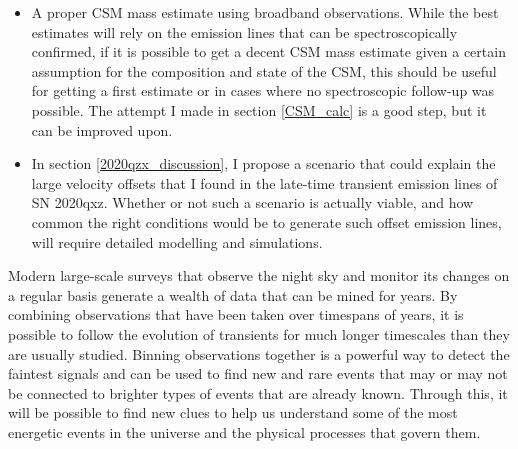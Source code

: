 \documentclass[a4paper,oneside,12pt, class=Latex/Classes/PhDthesisPSnPDF, crop=false]{standalone}
\begin{document}
\begin{itemize}
	\item A proper CSM mass estimate using broadband observations. While the best estimates will rely on the emission lines that can be spectroscopically confirmed, if it is possible to get a decent CSM mass estimate given a certain assumption for the composition and state of the CSM, this should be useful for getting a first estimate or in cases where no spectroscopic follow-up was possible. The attempt I made in section \ref{CSM_calc} is a good step, but it can be improved upon.
	\item In section \ref{2020qzx_discussion}, I propose a scenario that could explain the large velocity offsets that I found in the late-time transient emission lines of SN 2020qxz. Whether or not such a scenario is actually viable, and how common the right conditions would be to generate such offset emission lines, will require detailed modelling and simulations.
\end{itemize}

Modern large-scale surveys that observe the night sky and monitor its changes on a regular basis generate a wealth of data that can be mined for years. By combining observations that have been taken over timespans of years, it is possible to follow the evolution of transients for much longer timescales than they are usually studied. Binning observations together is a powerful way to detect the faintest signals and can be used to find new and rare events that may or may not be connected to brighter types of events that are already known. Through this, it will be possible to find new clues to help us understand some of the most energetic events in the universe and the physical processes that govern them.
\end{document}
